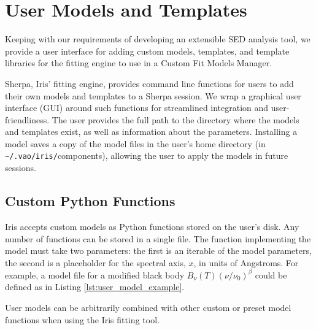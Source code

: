 \documentclass[final,5p,authoryear]{elsarticle}
\begin{document}

\section{User Models and Templates} \label{sec:usermodels}

Keeping with our requirements of developing an extensible SED analysis tool, we
provide a user interface for adding custom models, templates, and template
libraries for the fitting engine to use in a Custom Fit Models Manager.

Sherpa, Iris' fitting engine, provides command line functions for users to add
their own models and templates to a Sherpa session. We wrap a graphical user 
interface (GUI) around such functions for streamlined integration and 
user-friendliness.
The user provides the full path to the directory where the models and templates
exist, as well as information about the parameters. Installing a model saves a
copy of the model files in the user's home directory (in
\texttt{\~{}/.vao/iris/}components), allowing the user to apply the models in future
sessions.


\subsection{Custom Python Functions} Iris accepts custom models as Python
functions stored on the user's disk. Any number of functions can be stored in a
single file. The function implementing the model must take two parameters: the
first is an iterable of the model parameters, the second is a placeholder for
the spectral axis, $x$, in units of Angstroms. For example, a model file for a
modified black body \(B_{\nu}(T) \left(\nu/\nu_{0}\right)^{\beta}\) could be
defined as in Listing \ref{lst:user_model_example}.

User models can be arbitrarily combined with other custom or preset model
functions when using the Iris fitting tool.
\end{document}

